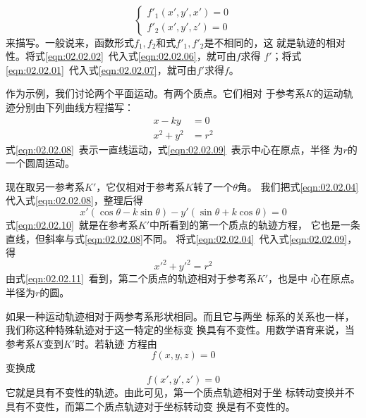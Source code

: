 ~\vspace{-1.56em}
\begin{equation}\label{eqn:02.02.07}
  \left\{\begin{array}{l}
    f'_1\left(x',y',x'\right)=0 \\
    f'_2\left(x',y',z'\right)=0
  \end{array}\right.
\end{equation}
来描写。一般说来，函数形式$f_1,f_2$和式$f'_1,f'_2$是不相同的，这
就是轨迹的相对性。将式\eqref{eqn:02.02.02}~代入式\eqref{eqn:02.02.06}，就可由$f$求得
$f'$；将式\eqref{eqn:02.02.01}~代入式\eqref{eqn:02.02.07}，就可由$f'$求得$f$。

作为示例，我们讨论两个平面运动。有两个质点。它们相对
于参考系$K$的运动轨迹分别由下列曲线方程描写：
\begin{align}
  x-ky    & =0  \label{eqn:02.02.08}  \\
  x^2+y^2 & =r^2 \label{eqn:02.02.09}
\end{align}
式\eqref{eqn:02.02.08}~表示一直线运动，式\eqref{eqn:02.02.09}~表示中心在原点，半径
为$r$的一个圆周运动。

现在取另一参考系$K'$，它仅相对于参考系$K$转了一个$\theta$角。
我们把式\eqref{eqn:02.02.04}代入式\eqref{eqn:02.02.08}，整理后得
{\setlength{\mathindent}{4em}
\begin{equation}\label{eqn:02.02.10}
  x'\left(\cos\theta - k\sin\theta\right)-y'\left(\sin\theta + k\cos\theta\right)=0
\end{equation}}%
式\eqref{eqn:02.02.10}~就是在参考系$K'$中所看到的第一个质点的轨迹方程，
它也是一条直线，但斜率与式\eqref{eqn:02.02.08}不同。
将式\eqref{eqn:02.02.04}~代入式\eqref{eqn:02.02.09}，得
\begin{equation}\label{eqn:02.02.11}
  x'^2+y'^2=r^2
\end{equation}
由式\eqref{eqn:02.02.11}~看到，第二个质点的轨迹相对于参考系$K'$，也是中
心在原点。半径为$r$的圆。

如果一种运动轨迹相对于两参考系形状相同。而且它与两坐
标系的关系也一样，我们称这种特殊轨迹对于这一特定的坐标变
换具有不变性。用数学语育来说，当参考系$K$变到$K'$时。若轨迹
方程由
\begin{equation*}
  f\left(x,y,z\right)=0
\end{equation*}
变换成
\begin{equation*}
  f\left(x',y',z'\right)=0
\end{equation*}
它就是具有不变性的轨迹。由此可见，第一个质点轨迹相对于坐
标转动变换并不具有不变性，而第二个质点轨迹对于坐标转动变
换是有不变性的。

